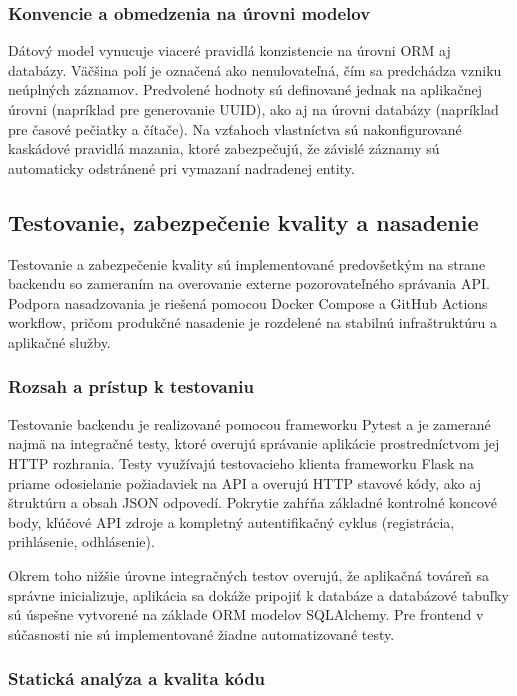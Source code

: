 \subsubsection{Konvencie a obmedzenia na úrovni modelov}

Dátový model vynucuje viaceré pravidlá konzistencie na úrovni ORM aj databázy. Väčšina polí je označená ako nenulovateľná, čím sa predchádza vzniku neúplných záznamov. Predvolené hodnoty sú definované jednak na aplikačnej úrovni (napríklad pre generovanie UUID), ako aj na úrovni databázy (napríklad pre časové pečiatky a čítače). Na vzťahoch vlastníctva sú nakonfigurované kaskádové pravidlá mazania, ktoré zabezpečujú, že závislé záznamy sú automaticky odstránené pri vymazaní nadradenej entity. 


\subsection{Testovanie, zabezpečenie kvality a nasadenie}

Testovanie a zabezpečenie kvality sú implementované predovšetkým na strane backendu so zameraním na overovanie externe pozorovateľného správania API. Podpora nasadzovania je riešená pomocou Docker Compose a GitHub Actions workflow, pričom produkčné nasadenie je rozdelené na stabilnú infraštruktúru a aplikačné služby.

\subsubsection{Rozsah a prístup k testovaniu} Testovanie backendu je realizované pomocou frameworku Pytest a je zamerané najmä na integračné testy, ktoré overujú správanie aplikácie prostredníctvom jej HTTP rozhrania. Testy využívajú testovacieho klienta frameworku Flask na priame odosielanie požiadaviek na API a overujú HTTP stavové kódy, ako aj štruktúru a obsah JSON odpovedí. Pokrytie zahŕňa základné kontrolné koncové body, kľúčové API zdroje a kompletný autentifikačný cyklus (registrácia, prihlásenie, odhlásenie).

Okrem toho nižšie úrovne integračných testov overujú, že aplikačná továreň sa správne inicializuje, aplikácia sa dokáže pripojiť k databáze a databázové tabuľky sú úspešne vytvorené na základe ORM modelov SQLAlchemy. Pre frontend v súčasnosti nie sú implementované žiadne automatizované testy.

\subsubsection{Statická analýza a kvalita kódu}

